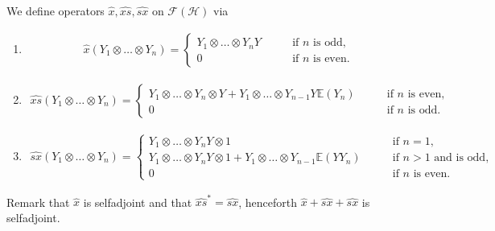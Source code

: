 \documentclass{amsart}
\begin{document}
 We define operators $\widehat{x}, \widehat{xs},\widehat{sx}$ on $\mathcal{F}(\mathcal{H})$ via
\begin{enumerate}

	\item \begin{align*}
		\widehat{x}\left(Y_1\otimes\ldots\otimes Y_n \right)=\begin{cases}
			Y_1\otimes\ldots\otimes Y_n Y\qquad &\mbox{if $n$ is odd,}\\
			0 \qquad &\mbox{if $n$ is even.}
		\end{cases}
	\end{align*}
	\item \begin{align*}
		\widehat{xs}\left(Y_1\otimes\ldots\otimes Y_n\right)=\begin{cases}
			Y_1\otimes\ldots\otimes Y_n\otimes Y+Y_1\otimes\ldots\otimes Y_{n-1}Y\mathbb{E}(Y_n)\qquad &\mbox{if $n$ is even,}\\
			0 \qquad &\mbox{if $n$ is odd.}
		\end{cases}
	\end{align*}
	\item \begin{align*}
		\widehat{sx}\left(Y_1\otimes\ldots\otimes Y_n\right)=\begin{cases}
			Y_1\otimes\ldots\otimes Y_n Y\otimes 1\qquad &\mbox{if $n=1$,}\\
			Y_1\otimes\ldots\otimes Y_n Y\otimes 1+Y_1\otimes\ldots\otimes Y_{n-1}\mathbb{E}(YY_n)\qquad &\mbox{if $n>1$ and is odd,}\\
			0 \qquad &\mbox{if $n$ is even.}
		\end{cases}
	\end{align*}
\end{enumerate}

  Remark that $ \widehat{x}$ is selfadjoint and that $ \widehat{xs}^\ast = \widehat{sx} $, henceforth 
  $ \widehat{x} + \widehat{sx} + \widehat{sx} $ is selfadjoint.
  
\end{document}
